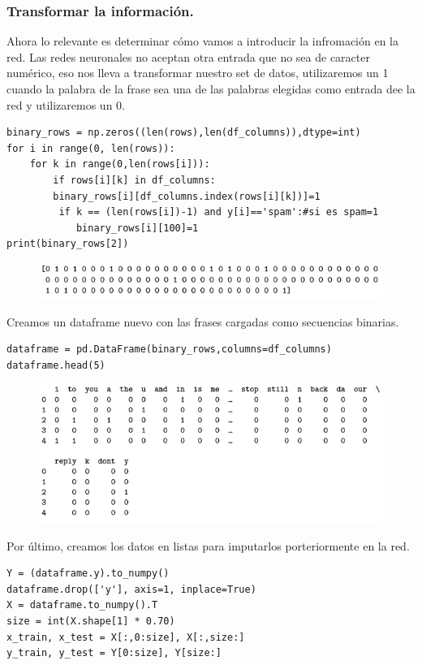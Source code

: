 \documentclass[a4paper,10pt]{article}
\begin{document}
\subsubsection{Transformar la información.}
Ahora lo relevante es determinar cómo vamos a introducir la infromación en la red. Las redes neuronales no aceptan otra entrada que no sea de caracter numérico, eso nos lleva a transformar nuestro set de datos, utilizaremos un 1 cuando la palabra de la frase sea una de las palabras elegidas como entrada dee la red y utilizaremos un 0.
\begin{lstlisting}
binary_rows = np.zeros((len(rows),len(df_columns)),dtype=int) 
for i in range(0, len(rows)): 
    for k in range(0,len(rows[i])):
        if rows[i][k] in df_columns: 
	    binary_rows[i][df_columns.index(rows[i][k])]=1
         if k == (len(rows[i])-1) and y[i]=='spam':#si es spam=1 
            binary_rows[i][100]=1
print(binary_rows[2])
\end{lstlisting}
\begin{figure}[H]
\centering
\includegraphics{Annotation 2020-03-23 182035.png}
\end{figure}
Creamos un dataframe nuevo con las frases cargadas como secuencias binarias.
\begin{lstlisting}
dataframe = pd.DataFrame(binary_rows,columns=df_columns) 
dataframe.head(5)
\end{lstlisting}
\begin{figure}[H]
\centering
\includegraphics{Annotation 2020-03-23 182154.png}
\end{figure}
Por último, creamos los datos en listas para imputarlos porteriormente en la red.
\begin{lstlisting}
Y = (dataframe.y).to_numpy() 
dataframe.drop(['y'], axis=1, inplace=True)
X = dataframe.to_numpy().T 
size = int(X.shape[1] * 0.70) 
x_train, x_test = X[:,0:size], X[:,size:] 
y_train, y_test = Y[0:size], Y[size:]
\end{lstlisting}
\end{document}
